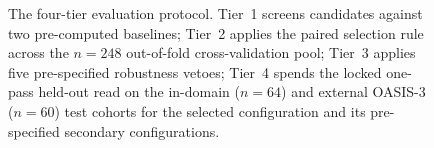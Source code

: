\documentclass[fontsize=11pt,paper=a4]{scrbook}
\newcommand{\bg}{black}
\newcommand{\fg}{white}
\newcommand{\bg}{white}
\newcommand{\fg}{black}
\begin{document}
\pagecolor{\bg}
\color{\fg}

\begin{figure}[htbp]
  \centering
  
  \caption{The four-tier evaluation protocol. Tier~1 screens candidates against two
  pre-computed baselines; Tier~2 applies the paired selection rule across the $n=248$
  out-of-fold cross-validation pool; Tier~3 applies five pre-specified robustness
  vetoes; Tier~4 spends the locked one-pass held-out read on the in-domain ($n=64$) and
  external OASIS-3 ($n=60$) test cohorts for the selected configuration and its
  pre-specified secondary configurations.}
  \label{fig:protocol-funnel}
\end{figure}
\end{document}
